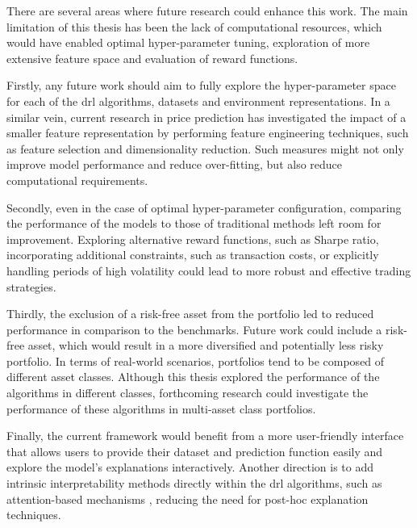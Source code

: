 There are several areas where future research could enhance this work. The main limitation of this thesis has been the lack of computational resources, which would have enabled optimal hyper-parameter tuning, exploration of more extensive feature space and evaluation of reward functions. 

Firstly, any future work should aim to fully explore the hyper-parameter space for each of the \acrshort{drl} algorithms, datasets and environment representations. In a similar vein, current research in price prediction has investigated the impact of a smaller feature representation by performing feature engineering techniques, such as feature selection and dimensionality reduction. Such measures might not only improve model performance and reduce over-fitting, but also reduce computational requirements.

Secondly, even in the case of optimal hyper-parameter configuration, comparing the performance of the models to those of traditional methods left room for improvement. Exploring alternative reward functions, such as Sharpe ratio, incorporating additional constraints, such as transaction costs, or explicitly handling periods of high volatility could lead to more robust and effective trading strategies. 

Thirdly, the exclusion of a risk-free asset from the portfolio led to reduced performance in comparison to the benchmarks. Future work could include a risk-free asset, which would result in a more diversified and potentially less risky portfolio. In terms of real-world scenarios, portfolios tend to be composed of different asset classes. Although this thesis explored the performance of the algorithms in different classes, forthcoming research could investigate the performance of these algorithms in multi-asset class portfolios.

Finally, the current framework would benefit from a more user-friendly interface that allows users to provide their dataset and prediction function easily and explore the model's explanations interactively. Another direction is to add intrinsic interpretability methods directly within the \acrshort{drl} algorithms, such as attention-based mechanisms \cite{Cortes2024}, reducing the need for post-hoc explanation techniques.